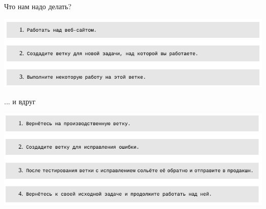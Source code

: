 \documentclass{beamer}
\begin{document}
\begin{frame}
\begin{block}{Что нам надо делать?}
\begin{center}
\includegraphics[scale=0.5]{images/ex-01.png}
\end{center}
\end{block}
\begin{block}{... и вдруг}
\begin{center}
\includegraphics[scale=0.5]{images/ex-02.png}
\end{center}
\end{block}
\end{frame}
\end{document}
